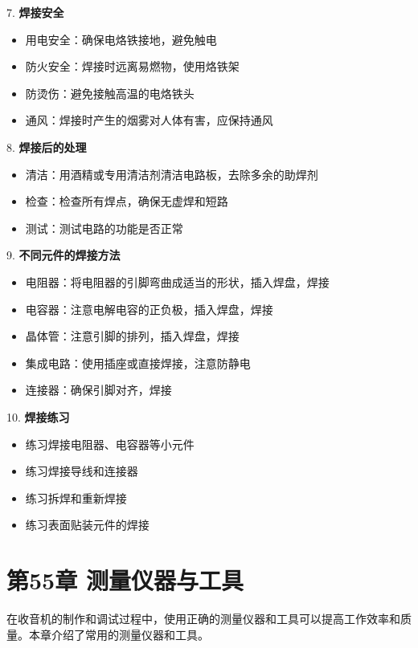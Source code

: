 \documentclass[12pt,UTF8]{ctexbook}
\begin{document}
7. \textbf{焊接安全}
   \begin{itemize}[leftmargin=3.5em]
   \item 用电安全：确保电烙铁接地，避免触电
   \item 防火安全：焊接时远离易燃物，使用烙铁架
   \item 防烫伤：避免接触高温的电烙铁头
   \item 通风：焊接时产生的烟雾对人体有害，应保持通风
   \end{itemize}

8. \textbf{焊接后的处理}
   \begin{itemize}[leftmargin=3.5em]
   \item 清洁：用酒精或专用清洁剂清洁电路板，去除多余的助焊剂
   \item 检查：检查所有焊点，确保无虚焊和短路
   \item 测试：测试电路的功能是否正常
   \end{itemize}

9. \textbf{不同元件的焊接方法}
   \begin{itemize}[leftmargin=3.5em]
   \item 电阻器：将电阻器的引脚弯曲成适当的形状，插入焊盘，焊接
   \item 电容器：注意电解电容的正负极，插入焊盘，焊接
   \item 晶体管：注意引脚的排列，插入焊盘，焊接
   \item 集成电路：使用插座或直接焊接，注意防静电
   \item 连接器：确保引脚对齐，焊接
   \end{itemize}

10. \textbf{焊接练习}
    \begin{itemize}[leftmargin=3.5em]
    \item 练习焊接电阻器、电容器等小元件
    \item 练习焊接导线和连接器
    \item 练习拆焊和重新焊接
    \item 练习表面贴装元件的焊接
    \end{itemize}\chapter*{第55章 测量仪器与工具}

在收音机的制作和调试过程中，使用正确的测量仪器和工具可以提高工作效率和质量。本章介绍了常用的测量仪器和工具。
\end{document}

